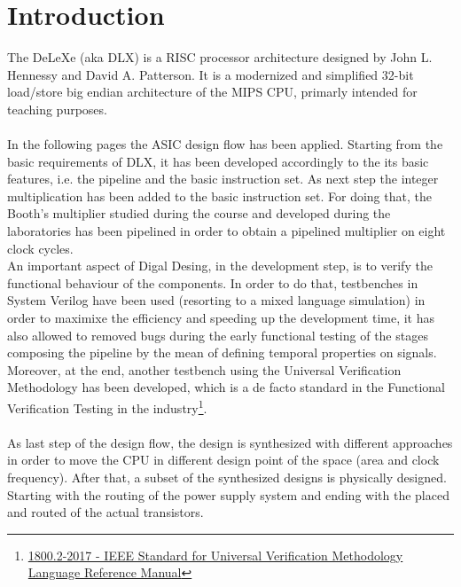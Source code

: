 \chapter{Introduction}
\label{Introduction}
The DeLeXe (aka DLX) is a RISC processor architecture designed by John L. Hennessy and David A. Patterson. It is a modernized and simplified  32-bit load/store big endian architecture of the MIPS CPU, primarly intended for teaching purposes.\\\\
In the following pages the ASIC design flow has been applied.
Starting from the basic requirements of DLX, it has been developed accordingly to the its basic features, i.e. the pipeline and the basic instruction set.
As next step the integer multiplication has been added to the basic instruction set. For doing that, the Booth's multiplier studied during the course and developed during the laboratories has been pipelined in order to obtain a pipelined multiplier on eight clock cycles.\\
An important aspect of Digal Desing, in the development step, is to verify the functional behaviour of the components. In order to do that, testbenches in System Verilog have been used (resorting to a mixed language simulation) in order to maximixe the efficiency and speeding up the development time, it has also allowed to removed bugs during the early functional testing of the stages composing the pipeline  by the mean of defining temporal properties on signals.
Moreover, at the end, another testbench using the Universal Verification Methodology has been developed, which is a de facto standard in the Functional Verification Testing in the industry\footnote{\href{https://standards.ieee.org/standard/1800_2-2017.html}{1800.2-2017 - IEEE Standard for Universal Verification Methodology Language Reference Manual}}.\\\\
As last step of the design flow, the design is synthesized with different approaches in order to move the CPU in different design point of the space (area and clock frequency). After that, a subset of the synthesized designs is physically designed. Starting with the routing of the power supply system and ending with the placed and routed of the actual transistors.